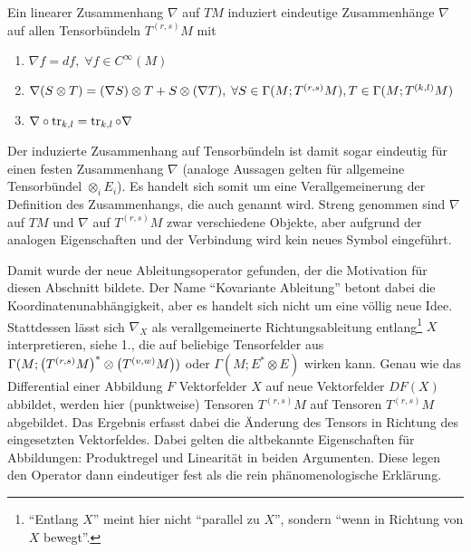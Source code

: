 \begin{satz}
Ein linearer Zusammenhang $\nabla$ auf $TM$ induziert eindeutige Zusammenhänge $\nabla$ auf allen Tensorbündeln $T^{(r, s)}M$ mit
\begin{enumerate}
\item $\nabla f = df, \; \forall f \in C^\infty(M)$

\item $\nabla \qty(S \otimes T) = \qty(\nabla S) \otimes T + S \otimes \qty(\nabla T), \; \forall S \in \Gamma(M; T^{(r, s)} M), T \in \Gamma(M; T^{(k, l)} M)$

\item $\nabla \circ \tr_{k, l} = \tr_{k, l} \circ \nabla$
\end{enumerate}
\end{satz}
Der induzierte Zusammenhang auf Tensorbündeln ist damit sogar eindeutig für einen festen Zusammenhang $\nabla$ (analoge Aussagen gelten für allgemeine Tensorbündel $\otimes_i E_i$). Es handelt sich somit um eine Verallgemeinerung der Definition des Zusammenhangs, die auch  genannt wird. 
Streng genommen sind $\nabla$ auf $TM$ und $\nabla$ auf $T^{(r, s)}M$ zwar verschiedene Objekte, aber aufgrund der analogen Eigenschaften und der Verbindung wird kein neues Symbol eingeführt.


Damit wurde der neue Ableitungsoperator gefunden, der die Motivation für diesen Abschnitt bildete. Der Name \enquote{Kovariante Ableitung} betont dabei die Koordinatenunabhängigkeit, aber es handelt sich nicht um eine völlig neue Idee. Stattdessen lässt sich $\nabla_X$ als verallgemeinerte Richtungsableitung entlang\footnote{\enquote{Entlang $X$} meint hier nicht \enquote{parallel zu $X$}, sondern \enquote{wenn in Richtung von $X$ bewegt}.} $X$ interpretieren, siehe 1., die auf beliebige Tensorfelder aus $\Gamma(M; \qty(T^{(r, s)} M)^* \otimes \qty(T^{(v, w)} M))$ oder $\Gamma(M; E^* \otimes E)$ wirken kann. Genau wie das Differential einer Abbildung $F$ Vektorfelder $X$ auf neue Vektorfelder $DF(X)$ abbildet, werden hier (punktweise) Tensoren $T^{(r, s)} M$ auf Tensoren $T^{(r, s)} M$ abgebildet. Das Ergebnis erfasst dabei die Änderung des Tensors in Richtung des eingesetzten Vektorfeldes. Dabei gelten die altbekannte Eigenschaften für Abbildungen: Produktregel und Linearität in beiden Argumenten. Diese legen den Operator dann eindeutiger fest als die rein phänomenologische Erklärung.



